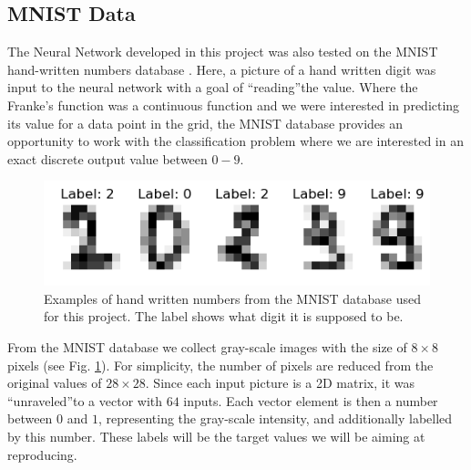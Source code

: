 \documentclass{emulateapj}
\begin{document}
\subsection{MNIST Data}\label{subsec: mnist data}

The Neural Network developed in this project was also tested on the MNIST hand-written numbers database \cite{MNIST}. Here, a picture of a hand written digit was input to the neural network with a goal of \textquotedblleft reading\textquotedblright the value. Where the Franke's function was a continuous function and we were interested in predicting its value for a data point in the grid, the MNIST database provides an opportunity to work with the classification problem where we are interested in an exact discrete output value between $0-9$.
\begin{figure}[!htb]
    \centering
    \includegraphics[width=.49\textwidth]{Figures/MNIST_illustrated.png}
    \caption{Examples of hand written numbers from the MNIST database used for this project. The label shows what digit it is supposed to be.}
    \label{fig:MNIST_illustrations}
\end{figure}

From the MNIST database we collect gray-scale images with the size of $8 \times 8$ pixels (see Fig. \ref{fig:MNIST_illustrations}). For simplicity, the number of pixels are reduced from the original values of $28 \times 28$. Since each input picture is a 2D matrix, it was \textquotedblleft unraveled\textquotedblright to a vector with $64$ inputs. Each vector element is then a number between $0$ and $1$, representing the gray-scale intensity, and additionally labelled by this number. These labels will be the target values we will be aiming at reproducing.
\end{document}
